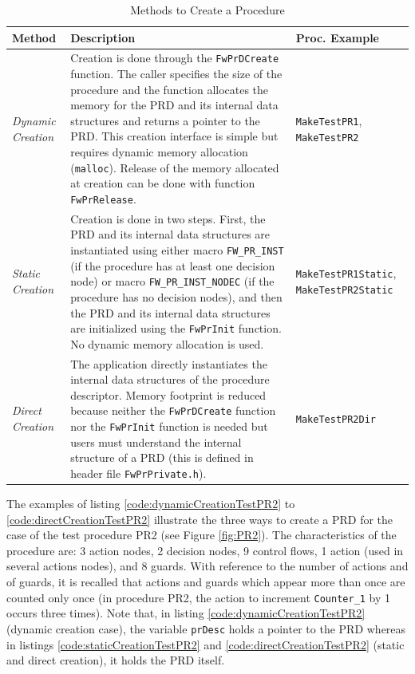 \documentclass[a4paper,10pt]{article}
\begin{document}
\begin{longtable}{|p{1.5cm}|p{6cm}|p{3cm}|}
\caption{Methods to Create a Procedure} \label{tab:prCreation}\\
\hline
\rowcolor{gray}
\textbf{Method} & \textbf{Description} & \textbf{Proc. Example}\\
\hline\hline
\emph{Dynamic Creation}  & Creation is done through the \texttt{FwPrDCreate} function. The caller specifies 
the size of the procedure and the function allocates the memory for the PRD and its internal data 
structures and returns a pointer to the PRD. This creation interface is simple but requires dynamic memory 
allocation (\texttt{malloc}). Release of the memory allocated at creation can be done with function \texttt{FwPrRelease}. 
& \texttt{MakeTestPR1}, \texttt{MakeTestPR2} \\
\hline
\emph{Static Creation} & Creation is done in two steps. First, the PRD and its internal data structures are 
instantiated using either macro \texttt{FW\_PR\_INST} (if the procedure has at least one decision node) or
macro \texttt{FW\_PR\_INST\_NODEC} (if the procedure has no decision nodes), and then the PRD and its 
internal data structures are initialized 
using the \texttt{FwPrInit} function. No dynamic memory allocation is used. & \texttt{MakeTestPR1Static}, \texttt{MakeTestPR2Static}\\
\hline
\emph{Direct Creation} & The application directly instantiates the internal data structures of the procedure 
descriptor. Memory footprint is reduced because neither the \texttt{FwPrDCreate} function nor the \texttt{FwPrInit} 
function is needed but users must understand the internal structure of a PRD (this is defined in header 
file \texttt{FwPrPrivate.h}). & \texttt{MakeTestPR2Dir} \\
\hline
\end{longtable}

\newpage

The examples of listing \ref{code:dynamicCreationTestPR2} to \ref{code:directCreationTestPR2} illustrate the 
three ways to create a PRD for the case of the test procedure PR2 
(see Figure \ref{fig:PR2}). The characteristics of the procedure are: 3 action nodes, 2 decision nodes, 
9 control flows, 1 action (used in several actions nodes), and 8 guards. 
With reference to the number of actions and of guards, it is recalled that actions and guards which appear 
more than once  are counted only once 
(in procedure PR2, the action to increment \texttt{Counter\_1} by 1 occurs three times).
Note that, in listing \ref{code:dynamicCreationTestPR2} (dynamic creation case), the variable \texttt{prDesc} 
holds a pointer to the PRD whereas in listings \ref{code:staticCreationTestPR2} and \ref{code:directCreationTestPR2} 
(static and direct creation), it holds the PRD itself.
\end{document}
